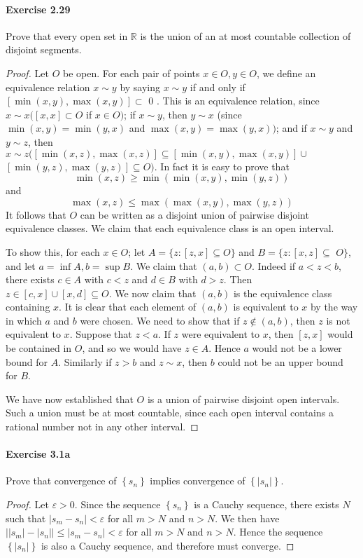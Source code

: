 \documentclass{article}
\theoremstyle{definition}
\begin{document}
\paragraph{Exercise 2.29} Prove that every open set in $\mathbb{R}$ is the union of an at most countable collection of disjoint segments.
\begin{proof}
    Let $O$ be open. For each pair of points $x \in O, y \in O$, we define an equivalence relation $x \sim y$ by saying $x \sim y$ if and only if $[\min (x, y), \max (x, y)] \subset$ 0 . This is an equivalence relation, since $x \sim x([x, x] \subset O$ if $x \in O)$; if $x \sim y$, then $y \sim x$ (since $\min (x, y)=\min (y, x)$ and $\max (x, y)=\max (y, x))$; and if $x \sim y$ and $y \sim z$, then $x \sim z([\min (x, z), \max (x, z)] \subseteq[\min (x, y), \max (x, y)] \cup$ $[\min (y, z), \max (y, z)] \subseteq O)$. In fact it is easy to prove that
$$
\min (x, z) \geq \min (\min (x, y), \min (y, z))
$$
and
$$
\max (x, z) \leq \max (\max (x, y), \max (y, z))
$$
It follows that $O$ can be written as a disjoint union of pairwise disjoint equivalence classes. We claim that each equivalence class is an open interval.

To show this, for each $x \in O$; let $A=\{z:[z, x] \subseteq O\}$ and $B=\{z:[x, z] \subseteq$ $O\}$, and let $a=\inf A, b=\sup B$. We claim that $(a, b) \subset O$. Indeed if $a<z<b$, there exists $c \in A$ with $c<z$ and $d \in B$ with $d>z$. Then $z \in[c, x] \cup[x, d] \subseteq O$. We now claim that $(a, b)$ is the equivalence class containing $x$. It is clear that each element of $(a, b)$ is equivalent to $x$ by the way in which $a$ and $b$ were chosen. We need to show that if $z \notin(a, b)$, then $z$ is not equivalent to $x$. Suppose that $z<a$. If $z$ were equivalent to $x$, then $[z, x]$ would be contained in $O$, and so we would have $z \in A$. Hence $a$ would not be a lower bound for $A$. Similarly if $z>b$ and $z \sim x$, then $b$ could not be an upper bound for $B$.

We have now established that $O$ is a union of pairwise disjoint open intervals. Such a union must be at most countable, since each open interval contains a rational number not in any other interval.
\end{proof}


\paragraph{Exercise 3.1a} Prove that convergence of $\left\{s_{n}\right\}$ implies convergence of $\left\{\left|s_{n}\right|\right\}$.
\begin{proof}
    Let $\varepsilon>0$. Since the sequence $\left\{s_n\right\}$ is a Cauchy sequence, there exists $N$ such that $\left|s_m-s_n\right|<\varepsilon$ for all $m>N$ and $n>N$. We then have $\left| |s_m| - |s_n| \right| \leq\left|s_m-s_n\right|<\varepsilon$ for all $m>N$ and $n>N$. Hence the sequence $\left\{\left|s_n\right|\right\}$ is also a Cauchy sequence, and therefore must converge.
\end{proof}
\end{document}
